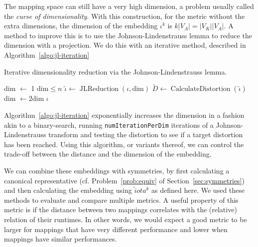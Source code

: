 The mapping space can still have a very high dimension, a problem usually called the \emph{curse of dimensionality}.
With this construction, for the metric without the extra dimensions, the dimension of the embedding $\iota^k$ is $k |V_A| = |V_K| |V_A|$.
A method to improve this is to use the Johnson-Lindenstrauss lemma to reduce the dimension with a projection.
We do this with an iterative method, described in Algorithm~\ref{algo:jl-iteration}

\begin{algorithm}
	\caption{Iterative dimensionality reduction via the Johnson-Lindenstrauss lemma.} 
	\label{algo:jl-iteration}
	\begin{algorithmic}[1]
	 \State dim $\leftarrow$ 1
	 \While $\text{dim} \leq n$
		       \State $\tilde \iota \leftarrow \operatorname{JLReduction}(\iota,\text{dim})$
			   \State $\tilde D \leftarrow \operatorname{CalculateDistortion}(\tilde \iota)$
			       \Return{$\tilde \iota$}
			   \EndIf
	   \EndFor 
	   \State dim $\leftarrow 2 \text{dim}$
   \EndWhile
   \Return $\iota$
	\end{algorithmic}
\end{algorithm}

Algorithm~\ref{algo:jl-iteration} exponentially increases the dimension in a fashion akin to a binary-search, running \texttt{numIterationPerDim} iterations of a Johnson-Lindenstrauss transform and testing the distortion to see if a target distortion has been reached.
Using this algorithm, or variants thereof, we can control the trade-off between the distance and the dimension of the embedding.

We can combine these embeddings with symmetries, by first calculating a canonical representative (cf. Problem~\ref{prob:equiv} of Section~\ref{sec:symmetries}) and then calculating the embedding using $\tilde iota^k$ as defined here.
We used these methods to evaluate and compare multiple metrics. 
A useful property of this metric is if the distance between two mappings correlates with the (relative) relation of their runtimes.
In other words, we would expect a good metric to be larger for mappings that have very different performance and lower when mappings have similar performances.

